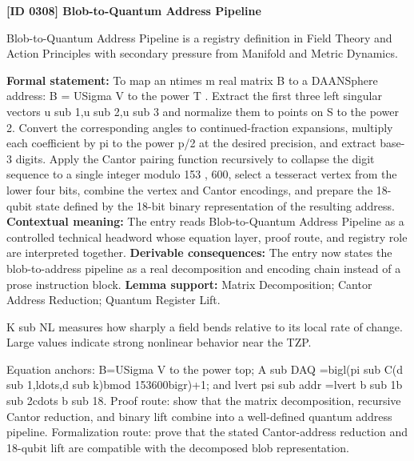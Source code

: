 \clearpage
\noindent\textbf{[ID 0308] Blob-to-Quantum Address Pipeline}\par
\vspace{0.35em}
\begingroup\small
{}
Blob-to-Quantum Address Pipeline is a registry definition in Field Theory and Action Principles with secondary pressure from Manifold and Metric Dynamics.

\begingroup\footnotesize\setlength{\emergencystretch}{3em}\sloppy
\textbf{Formal statement:} To map an ntimes m real matrix B to a DAANSphere address: B = USigma V to the power T . Extract the first three left singular vectors u sub 1,u sub 2,u sub 3 and normalize them to points on S to the power 2. Convert the corresponding angles to continued-fraction expansions, multiply each coefficient by pi to the power p/2 at the desired precision, and extract base-3 digits. Apply the Cantor pairing function recursively to collapse the digit sequence to a single integer modulo 153 , 600, select a tesseract vertex from the lower four bits, combine the vertex and Cantor encodings, and prepare the 18-qubit state defined by the 18-bit binary representation of the resulting address. \textbf{Contextual meaning:} The entry reads Blob-to-Quantum Address Pipeline as a controlled technical headword whose equation layer, proof route, and registry role are interpreted together. \textbf{Derivable consequences:} The entry now states the blob-to-address pipeline as a real decomposition and encoding chain instead of a prose instruction block. \textbf{Lemma support:} Matrix Decomposition; Cantor Address Reduction; Quantum Register Lift.\par
\endgroup

K sub NL measures how sharply a field bends relative to its local rate of change. Large values indicate strong nonlinear behavior near the TZP.

Equation anchors: B=USigma V to the power top; A sub DAQ =bigl(pi sub C(d sub 1,ldots,d sub k)bmod 153600bigr)+1; and lvert psi sub addr =lvert b sub 1b sub 2cdots b sub 18. Proof route: show that the matrix decomposition, recursive Cantor reduction, and binary lift combine into a well-defined quantum address pipeline. Formalization route: prove that the stated Cantor-address reduction and 18-qubit lift are compatible with the decomposed blob representation.

